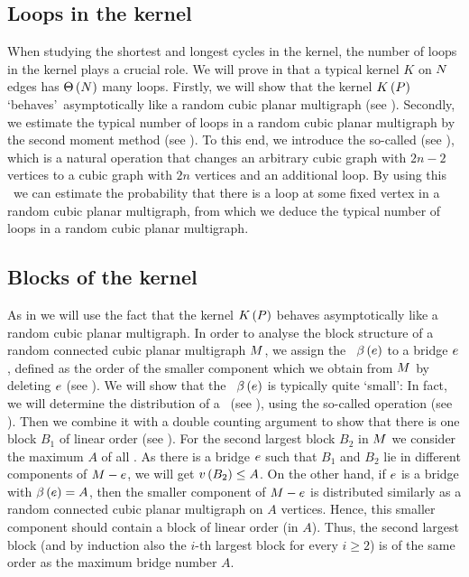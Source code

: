 \subsection{Loops in the kernel}\label{CBsub:cycles_kernel}
When studying the shortest and longest cycles in the kernel, the number of loops in the kernel plays a crucial role. We will prove in  that a typical kernel $K$ on $N$ edges has $\Theta\left(N\right)$ many loops. Firstly, we will show that the kernel $K\left(P\right)$ \lq behaves\rq\ asymptotically like a random cubic planar multigraph (see ). Secondly, we estimate the typical number of loops in a random cubic planar multigraph by the second moment method (see ). To this end, we introduce the so-called {\em \loopInsertion} (see ), which is a natural operation that changes an arbitrary cubic graph with $2n-2$ vertices to a cubic graph with $2n$ vertices and an additional loop. By using this \loopInsertion\ we can estimate the probability that there is a loop at some fixed vertex in a random cubic planar multigraph, from which we deduce the typical number of loops in a random cubic planar multigraph.

\subsection{Blocks of the kernel}\label{CBsub:block_kernel}
As in  we will use the fact that the kernel $K\left(P\right)$ behaves asymptotically like a random cubic planar multigraph. In order to analyse the block structure of a random connected cubic planar multigraph $M$, we assign the \bridgeNumber\ $\beta\left(e\right)$ to a bridge $e$, defined as the order of the smaller component which we obtain from $M$ by deleting $e$ (see ). We will show that the \bridgeNumber\ $\beta\left(e\right)$ is typically quite \lq small\rq: In fact, we will determine the distribution of a \bridgeNumber\ (see ), using the so-called {\em \bridgeInsertion} operation (see ). Then we combine it with a double counting argument to show that there is one block $B_1$ of linear order (see ). For the second largest block $B_2$ in $M$ we consider the maximum $A$ of all \bridgeNumbers. As there is a bridge $e$ such that $B_1$ and $B_2$ lie in different components of $M-e$, we will get $v\left({B_2}\right)\leq A$. On the other hand, if $e$ is a bridge with $\beta\left(e\right)=A$, then the smaller component of $M-e$ is distributed similarly as a random connected cubic planar multigraph on $A$ vertices. Hence, this smaller component should contain a block of linear order (in $A$). Thus, the second largest block (and by induction also the $i$-th largest block for every $i\geq 2$) is of the same order as the maximum bridge number $A$. 

